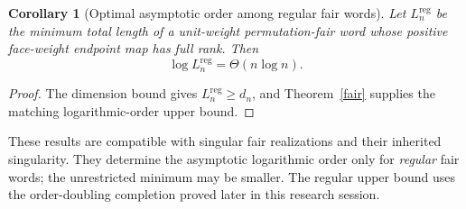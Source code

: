 \documentclass[11pt]{article}
\newtheorem{corollary}{Corollary}
\begin{document}
\begin{corollary}[Optimal asymptotic order among regular fair words]
Let $L_n^{\mathrm{reg}}$ be the minimum total length of a unit-weight
permutation-fair word whose positive face-weight endpoint map has full
rank. Then
\[
 \log L_n^{\mathrm{reg}}=\Theta(n\log n).
\]
\end{corollary}
\begin{proof}
The dimension bound gives $L_n^{\mathrm{reg}}\ge d_n$, and
Theorem~\ref{fair} supplies the matching logarithmic-order upper bound.
\end{proof}
These results are compatible with singular fair realizations and their
inherited singularity. They determine the asymptotic logarithmic order
only for \emph{regular} fair words; the unrestricted minimum may be
smaller. The regular upper bound uses the order-doubling completion
proved later in this research session.
\end{document}
